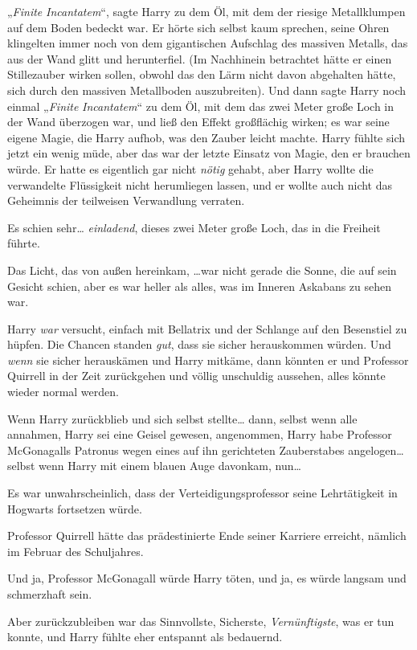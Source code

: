 {„\emph{Finite} \emph{Incantatem}“, sagte Harry zu dem Öl, mit dem der riesige Metallklumpen auf dem Boden bedeckt war. Er hörte sich selbst kaum sprechen, seine Ohren klingelten immer noch von dem gigantischen Aufschlag des massiven Metalls, das aus der Wand glitt und herunterfiel. (Im Nachhinein betrachtet hätte er einen Stillezauber wirken sollen, obwohl das den Lärm nicht davon abgehalten hätte, sich durch den massiven Metallboden auszubreiten). Und dann sagte Harry noch einmal „\emph{Finite} \emph{Incantatem}“ zu dem Öl, mit dem das zwei Meter große Loch in der Wand überzogen war, und ließ den Effekt großflächig wirken; es war seine eigene Magie, die Harry aufhob, was den Zauber leicht machte. Harry fühlte sich jetzt ein wenig müde, aber das war der letzte Einsatz von Magie, den er brauchen würde. Er hatte es eigentlich gar nicht \emph{nötig} gehabt, aber Harry wollte die verwandelte Flüssigkeit nicht herumliegen lassen, und er wollte auch nicht das Geheimnis der teilweisen Verwandlung verraten.

Es schien sehr… \emph{einladend}, dieses zwei Meter große Loch, das in die Freiheit führte.

Das Licht, das von außen hereinkam, …war nicht gerade die Sonne, die auf sein Gesicht schien, aber es war heller als alles, was im Inneren Askabans zu sehen war.

Harry \emph{war} versucht, einfach mit Bellatrix und der Schlange auf den Besenstiel zu hüpfen. Die Chancen standen \emph{gut}, dass sie sicher herauskommen würden. Und \emph{wenn} sie sicher herauskämen und Harry mitkäme, dann könnten er und Professor Quirrell in der Zeit zurückgehen und völlig unschuldig aussehen, alles könnte wieder normal werden.

Wenn Harry zurückblieb und sich selbst stellte… dann, selbst wenn alle annahmen, Harry sei eine Geisel gewesen, angenommen, Harry habe Professor McGonagalls Patronus wegen eines auf ihn gerichteten Zauberstabes angelogen… selbst wenn Harry mit einem blauen Auge davonkam, nun…

Es war unwahrscheinlich, dass der Verteidigungsprofessor seine Lehrtätigkeit in Hogwarts fortsetzen würde.

Professor Quirrell hätte das prädestinierte Ende seiner Karriere erreicht, nämlich im Februar des Schuljahres.

Und ja, Professor McGonagall würde Harry töten, und ja, es würde langsam und schmerzhaft sein.

Aber zurückzubleiben war das Sinnvollste, Sicherste, \emph{Vernünftigste}, was er tun konnte, und Harry fühlte eher entspannt als bedauernd.

}
